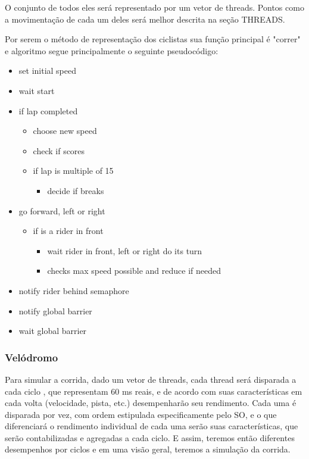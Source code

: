 \documentclass[12pt,a4paper]{article}
\begin{document}
    O conjunto de todos eles será representado por um vetor de threads. Pontos como a movimentação de cada um deles será melhor descrita na seção THREADS.
    
    Por serem o método de representação dos ciclistas sua função principal é "correr" e algoritmo segue principalmente o seguinte pseudocódigo:
    
    \begin{itemize}
    \item set initial speed
    \item wait start
    \item if lap completed   
    \begin{itemize}
      \item choose new speed
      \item check if scores
      \item if lap is multiple of 15
      \begin{itemize}
        \item decide if breaks
      \end{itemize}
    \end{itemize}
    \item go forward, left or right
    \begin{itemize}
      \item if is a rider in front
      \begin{itemize}
        \item wait rider in front, left or right do its turn
        \item checks max speed possible and reduce if needed
      \end{itemize}
    \end{itemize}
    \item notify rider behind semaphore
    \item notify global barrier
    \item wait global barrier
    \end{itemize}
    
\subsubsection{Velódromo}

    Para simular a corrida, dado um vetor de threads, cada thread será disparada a cada ciclo , que representam 60 ms reais, e de acordo com suas características em cada volta (velocidade, pista, etc.) desempenharão seu rendimento. Cada uma é disparada por vez, com ordem estipulada especificamente pelo SO, e o que diferenciará o rendimento individual de cada uma serão suas características, que serão contabilizadas e agregadas a cada ciclo. E assim, teremos então diferentes desempenhos por ciclos e em uma visão geral, teremos a simulação da corrida.
    
\end{document}
